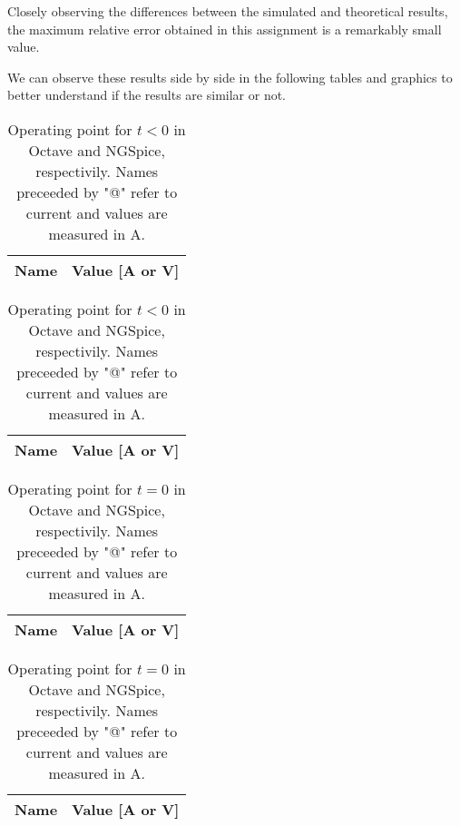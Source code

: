 Closely observing the differences between the simulated and theoretical results, the maximum relative error obtained in this assignment is a remarkably small value.

We can observe these results side by side in the following tables and graphics to better understand if the results are similar or not.

\begin{table}[h]
	\centering
	\begin{minipage}[t]{0.33\linewidth}
	 	 \begin{tabular}[t]{|l|r|}
	 	   \hline    
	 	   {\bf Name} & {\bf Value [A or V]} \\ \hline
	 	   
	 	 \end{tabular}
	 	 \label{tab:ct1}
	\end{minipage}
	\begin{minipage}[t]{0.33\linewidth}
	  		\begin{tabular}[t]{|l|r|}
	    	\hline    
	   		{\bf Name} & {\bf Value [A or V]} \\ \hline
	    	
	  		\end{tabular}
	  	\label{tab:cs1}
	\end{minipage}
	  	\caption{Operating point for $t<0$ in Octave and NGSpice, respectivily. Names preceeded by "@" refer to current and values are measured in A.}
\end{table}

\begin{table}[h]
	\centering
	\begin{minipage}[t]{0.33\linewidth}
	 	 \begin{tabular}[t]{|l|r|}
	 	   \hline    
	 	   {\bf Name} & {\bf Value [A or V]} \\ \hline
	 	   
	 	 \end{tabular}
	 	 \label{tab:ct2}
	\end{minipage}
	\begin{minipage}[t]{0.33\linewidth}
	  		\begin{tabular}[t]{|l|r|}
	    	\hline    
	   		{\bf Name} & {\bf Value [A or V]} \\ \hline
	    	
	  		\end{tabular}
	  	\label{tab:cs2}
	\end{minipage}
	  	\caption{Operating point for $t=0$ in Octave and NGSpice, respectivily. Names preceeded by "@" refer to current and values are measured in A.}
\end{table}


\newpage
\newpage

